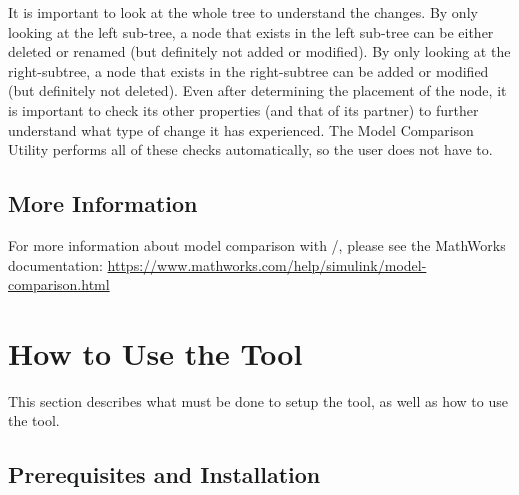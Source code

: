 \documentclass{article}
\makeatletter
\newcommand{\ToolName}{Model Comparison Utility\@\xspace}
\makeatother
\begin{document}
It is important to look at the whole tree to understand the changes. By only looking at the left sub-tree, a node that exists in the left sub-tree can be either deleted or renamed (but definitely not added or modified). By only looking at the right-subtree, a node that exists in the right-subtree can be added or modified (but definitely not deleted). Even after determining the placement of the node, it is important to check its other properties (and that of its partner) to further understand what type of change it has experienced. The \ToolName performs all of these checks automatically, so the user does not have to.

\subsection{More Information}
For more information about model comparison with \Matlab/\Simulink, please see the MathWorks documentation: \newline
\url{https://www.mathworks.com/help/simulink/model-comparison.html}

\pagebreak	
\section{How to Use the Tool}
This section describes what must be done to setup the tool, as well as how to use the tool.

\subsection{Prerequisites and Installation}
\end{document}
